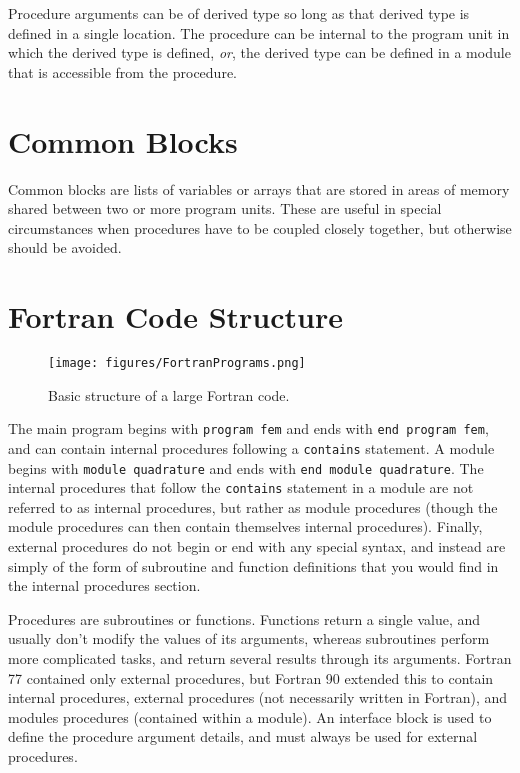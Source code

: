 \documentclass[10pt]{article}
\begin{document}
Procedure arguments can be of derived type so long as that derived type is defined in a single location. The procedure can be internal to the program unit in which the derived type is defined, {\it or}, the derived type can be defined in a module that is accessible from the procedure. 

\section{Common Blocks}
Common blocks are lists of variables or arrays that are stored in areas of memory shared between two or more program units. These are useful in special circumstances when procedures have to be coupled closely together, but otherwise should be avoided. 

\section{Fortran Code Structure}

\begin{figure}[H]
\centering
\texttt{[image: figures/FortranPrograms.png]}
\caption{Basic structure of a large Fortran code.}
\end{figure}

The main program begins with {\tt program fem} and ends with {\tt end program fem}, and can contain internal procedures following a {\tt contains} statement. A module begins with {\tt module quadrature} and ends with {\tt end module quadrature}. The internal procedures that follow the {\tt contains} statement in a module are not referred to as internal procedures, but rather as module procedures (though the module procedures can then contain themselves internal procedures). Finally, external procedures do not begin or end with any special syntax, and instead are simply of the form of subroutine and function definitions that you would find in the internal procedures section.

Procedures are subroutines or functions. Functions return a single value, and usually don't modify the values of its arguments, whereas subroutines perform more complicated tasks, and return several results through its arguments. Fortran 77 contained only external procedures, but Fortran 90 extended this to contain internal procedures, external procedures (not necessarily written in Fortran), and modules procedures (contained within a module). An interface block is used to define the procedure argument details, and must always be used for external procedures.
\end{document}
